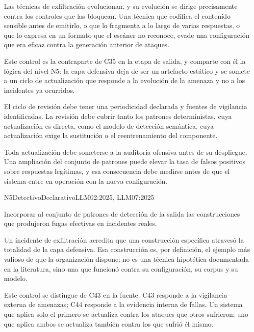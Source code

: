 Las técnicas de exfiltración evolucionan, y su evolución se dirige precisamente contra los controles que las bloquean. Una técnica que codifica el contenido sensible antes de emitirlo, o que lo fragmenta a lo largo de varias respuestas, o que lo expresa en un formato que el escáner no reconoce, evade una configuración que era eficaz contra la generación anterior de ataques.

Este control es la contraparte de C35 en la etapa de salida, y comparte con él la lógica del nivel N5: la capa defensiva deja de ser un artefacto estático y se somete a un ciclo de actualización que responde a la evolución de la amenaza y no a los incidentes ya ocurridos.

El ciclo de revisión debe tener una periodicidad declarada y fuentes de vigilancia identificadas. La revisión debe cubrir tanto los patrones deterministas, cuya actualización es directa, como el modelo de detección semántica, cuya actualización exige la sustitución o el reentrenamiento del componente.

Toda actualización debe someterse a la auditoría ofensiva antes de su despliegue. Una ampliación del conjunto de patrones puede elevar la tasa de falsos positivos sobre respuestas legítimas, y esa consecuencia debe medirse antes de que el sistema entre en operación con la nueva configuración.


  {N5}{Detectivo}{Declarativo}{LLM02:2025, LLM07:2025}

Incorporar al conjunto de patrones de detección de la salida las construcciones que produjeron fugas efectivas en incidentes reales.

Un incidente de exfiltración acredita que una construcción específica atravesó la totalidad de la capa defensiva. Esa construcción es, por definición, el ejemplo más valioso de que la organización dispone: no es una técnica hipotética documentada en la literatura, sino una que funcionó contra su configuración, su corpus y su modelo.

Este control se distingue de C43 en la fuente. C43 responde a la vigilancia externa de amenazas; C44 responde a la evidencia interna de fallas. Un sistema que aplica solo el primero se actualiza contra los ataques que otros sufrieron; uno que aplica ambos se actualiza también contra los que sufrió él mismo.


